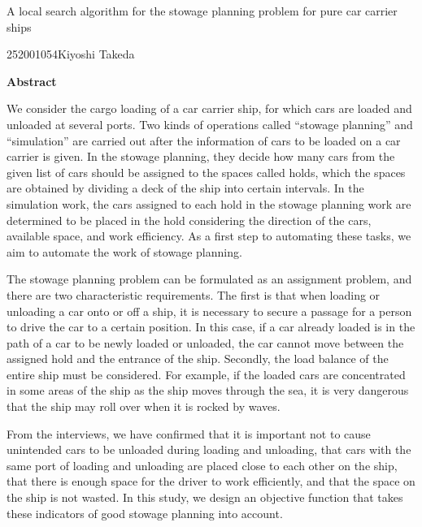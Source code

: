 \newpage
\begin{center}{\LARGE A local search algorithm for the stowage planning problem for pure car carrier ships }\\[0.5cm]
\end{center}
\hfill {\large 252001054\qquad Kiyoshi Takeda}\\[0.5cm]
\begin{center}
{\large \bf Abstract}\\
\end{center}

We consider the cargo loading of a car carrier ship, for which cars are loaded and unloaded at several ports.
Two kinds of operations called “stowage planning” and “simulation” are carried out after the information of cars to be loaded on a car carrier is given.
In the stowage planning, they decide how many cars from the given list of cars should be assigned to the spaces called holds, which the spaces are obtained by dividing a deck of the ship into certain intervals.
In the simulation work, the cars assigned to each hold in the stowage planning work are determined to be placed in the hold considering the direction of the cars, available space, and work efficiency.
As a first step to automating these tasks, we aim to automate the work of stowage planning.

The stowage planning problem can be formulated as an assignment problem, and there are two characteristic requirements.
The first is that when loading or unloading a car onto or off a ship, it is necessary to secure a passage for a person to drive the car to a certain position.
In this case, if a car already loaded is in the path of a car to be newly loaded or unloaded, the car cannot move between the assigned hold and the entrance of the ship.
Secondly, the load balance of the entire ship must be considered.
For example, if the loaded cars are concentrated in some areas of the ship as the ship moves through the sea, it is very dangerous that the ship may roll over when it is rocked by waves.

From the interviews, we have confirmed that it is important not to cause unintended cars to be unloaded during loading and unloading, that cars with the same port of loading and unloading are placed close to each other on the ship, that there is enough space for the driver to work efficiently, and that the space on the ship is not wasted. In this study, we design an objective function that takes these indicators of good stowage planning into account.

